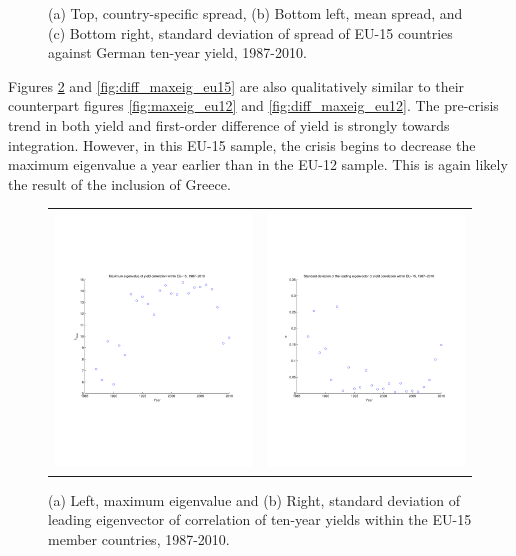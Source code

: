 \documentclass[3p]{elsarticle}
\begin{document}
\begin{figure}[ht!]
\begin{tabular}{cc}
	\end{tabular}
	\caption{(a) Top, country-specific spread, (b) Bottom left, mean spread, and (c) Bottom right, standard deviation of spread of EU-15 countries against German ten-year yield, 1987-2010.}
	\label{fig:de_spread_eu15}
\end{figure}

Figures \ref{fig:maxeig_eu15} and \ref{fig:diff_maxeig_eu15} are also qualitatively similar to their counterpart figures \ref{fig:maxeig_eu12} and \ref{fig:diff_maxeig_eu12}.  The pre-crisis trend in both yield and first-order difference of yield is strongly towards integration.  However, in this EU-15 sample, the crisis begins to decrease the maximum eigenvalue a year earlier than in the EU-12 sample.  This is again likely the result of the inclusion of Greece.

\begin{figure}[ht!]
	\centering
	\begin{tabular}{cc}
		\includegraphics[width=7cm]{fig_maxeig_eu15} & \includegraphics[width=7cm]{fig_maxeigstd_eu15}
	\end{tabular}
	\caption{(a) Left, maximum eigenvalue and (b) Right, standard deviation of leading eigenvector of correlation of ten-year yields within the EU-15 member countries, 1987-2010.}
	\label{fig:maxeig_eu15}
\end{figure}
\end{document}
